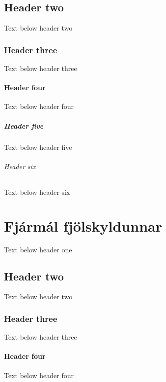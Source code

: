 \documentclass[a4paper,10pt,icelandic]{sphinxmanual}
\begin{document}
\section{Header two}
\label{\detokenize{husnaedismal/index:header-two}}
\sphinxAtStartPar
Text below header two


\subsection{Header three}
\label{\detokenize{husnaedismal/index:header-three}}
\sphinxAtStartPar
Text below header three


\subsubsection{Header four}
\label{\detokenize{husnaedismal/index:header-four}}
\sphinxAtStartPar
Text below header four


\paragraph{Header five}
\label{\detokenize{husnaedismal/index:header-five}}
\sphinxAtStartPar
Text below header five


\subparagraph{Header six}
\label{\detokenize{husnaedismal/index:header-six}}
\sphinxAtStartPar
Text below header six

\sphinxstepscope


\chapter{Fjármál fjölskyldunnar}
\label{\detokenize{fjarmal-fjolskyldunnar/index:fjarmal-fjolskyldunnar}}\label{\detokenize{fjarmal-fjolskyldunnar/index::doc}}
\sphinxAtStartPar
Text below header one


\section{Header two}
\label{\detokenize{fjarmal-fjolskyldunnar/index:header-two}}
\sphinxAtStartPar
Text below header two


\subsection{Header three}
\label{\detokenize{fjarmal-fjolskyldunnar/index:header-three}}
\sphinxAtStartPar
Text below header three


\subsubsection{Header four}
\label{\detokenize{fjarmal-fjolskyldunnar/index:header-four}}
\sphinxAtStartPar
Text below header four
\end{document}
